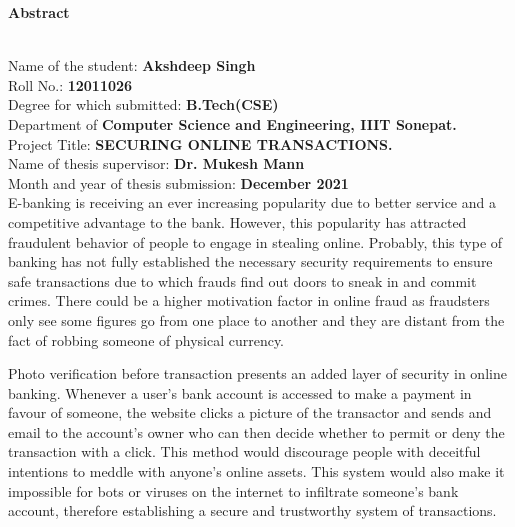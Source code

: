 \documentclass[12pt, oneside, a4paper]{article}
\begin{document}
\begin{center}
    \begin{Large}\textbf{Abstract}\end{Large}
\end{center}\\
\vspace{1cm}
Name of the student: \textbf{Akshdeep Singh}\vspace{0.1cm}\\
Roll No.: \textbf{12011026}
\vspace{0.3cm}\\
Degree for which submitted: \textbf{B.Tech(CSE)}\vspace{0.2cm}\\
Department of \textbf{Computer Science and Engineering, IIIT Sonepat.}\vspace{0.2cm}\\
Project Title: \textbf{SECURING ONLINE TRANSACTIONS.}\vspace{0.2cm}\\
Name of thesis supervisor: \textbf{Dr. Mukesh Mann}\vspace{0.2cm}\\
Month and year of thesis submission: \textbf{December 2021}
\vspace{2cm}\\
E-banking is receiving an ever increasing popularity due to better service and a competitive advantage to the bank. However, this popularity has attracted fraudulent behavior of people to engage in stealing online. Probably, this type of banking has not fully established the necessary security requirements to ensure safe transactions due to which frauds find out doors to sneak in and commit crimes. There could be a higher motivation factor in online fraud as fraudsters only see some figures go from one place to another and they are distant from the fact of robbing someone of physical currency.

\vspace{0.5cm}
Photo verification before transaction presents an added layer of security in online banking. Whenever a user's bank account is accessed to make a payment in favour of someone, the website clicks a picture of the transactor and sends and email to the account's owner who can then decide whether to permit or deny the transaction with a click. This method would discourage people with deceitful intentions to meddle with anyone's online assets. This system would also make it impossible for bots or viruses on the internet to infiltrate someone's bank account, therefore establishing a secure and trustworthy system of transactions.
\end{document}
